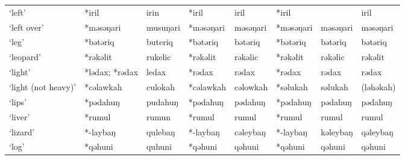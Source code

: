 \begin{landscape}
\begin{longtable}[c]{@{}p{3cm}<{\raggedright}p{2.75cm}<{\raggedright}p{2.75cm}<{\raggedright}p{2.75cm}<{\raggedright}p{2.75cm}<{\raggedright}p{2.75cm}<{\raggedright}p{2.75cm}<{\raggedright}p{2.75cm}<{\raggedright}@{}}
`left'                                               & *iril              & irin                           & *iril              & iril                       & *iril            &                          & iril                              \\
`left over'                                          & *məsəŋari          & musuŋari                       & *məsəŋari          & məsəŋari                   & *məsəŋari        & məsəŋari                 & məsəŋari                          \\
`leg'                                                & *bətəriq           & buteriq                        & *bətəriq           & bətəriq                    & *bətəriq         & bətəriq                  & bətəriq                           \\
`leopard'                                            & *rəkəlit           & rukelic                        & *rəkəlit           & rəkəlic                    & *rəkəlit         & rəkəlic                  & rəkəlit                           \\
`light'                                              & *lədax; *rədax             & ledax                          & *rədax             & rədax                      & *rədax           & rədax                    & rədax                             \\
`light (not heavy)'                                  & *cəlawkah          & culokah                        & *cəlawkah          & cəlowkah                   & *səlukah         & səlukah                  & (ləhəkah)                         \\
`lips'                                               & *pədahuŋ           & pudahuŋ                        & *pədahuŋ           & pədahuŋ                    & *pədahuŋ         & pədahuŋ                  & pədahuŋ                           \\
`liver'                                              & *rumul             & rumun                          & *rumul             & rumul                      & *rumul           & rumul                    & rumul                             \\
`lizard'                                             & *-laybaŋ           & qulebaŋ                        & *-laybaŋ           & cəleybaŋ                   & *-laybaŋ         & kəleybaŋ                 & qəleybaŋ                          \\
`log'                                                & *qəhuni            & quhuni                         & *qəhuni            & qəhuni                     & *qəhuni          & qəhuni                   & qəhuni                            \\

\end{longtable}
\end{landscape}
